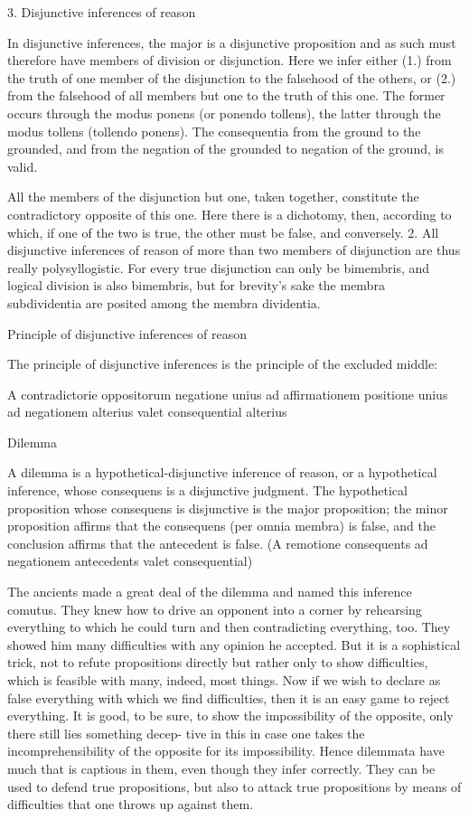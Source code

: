 3. Disjunctive inferences of reason

In disjunctive inferences, the major is a disjunctive proposition and as such
must therefore have members of division or disjunction. Here we infer either
(1.) from the truth of one member of the
disjunction to the falsehood of the others, or
(2.) from the falsehood of all members but one to the truth of this one.
The former occurs through the modus ponens (or ponendo tollens),
the latter through the modus tollens (tollendo ponens).
The consequentia from the ground to the grounded,
and from the negation of the grounded to negation of the ground, is valid.

    All the members of the disjunction but one, taken together, constitute the
    contradictory opposite of this one.
    Here there is a dichotomy, then, according to which,
    if one of the two is true, the other must be false, and conversely.
    2. All disjunctive inferences of reason of more than two members of
    disjunction are thus really polysyllogistic.
    For every true disjunction can only be bimembris,
    and logical division is also bimembris,
    but for brevity's sake the membra subdividentia are
    posited among the membra dividentia.

Principle of disjunctive inferences of reason

The principle of disjunctive inferences is
the principle of the excluded middle:

A contradictorie oppositorum negatione unius ad affirmationem
positione unius ad negationem alterius valet consequential alterius

Dilemma

A dilemma is a hypothetical-disjunctive inference of reason,
or a hypothetical inference, whose consequens is a disjunctive judgment.
The hypothetical proposition whose consequens is disjunctive is the major proposition;
the minor proposition affirms that the consequens (per omnia membra) is false, and
the conclusion affirms that the antecedent is false.
(A remotione consequents ad negationem antecedents valet consequential)

    The ancients made a great deal of the dilemma and
    named this inference comutus.
    They knew how to drive an opponent into a corner by rehearsing
    everything to which he could turn and then contradicting everything, too.
    They showed him many difficulties with any opinion he accepted. But it is
    a sophistical trick, not to refute propositions directly but rather only to
    show difficulties, which is feasible with many, indeed, most things.
    Now if we wish to declare as false everything with which we find difficulties,
    then it is an easy game to reject everything. It is good, to be sure, to
    show the impossibility of the opposite, only there still lies something decep-
    tive in this in case one takes the incomprehensibility of the opposite for its
    impossibility. Hence dilemmata have much that is captious in them, even
    though they infer correctly. They can be used to defend true propositions,
    but also to attack true propositions by means of difficulties that one throws
    up against them.

